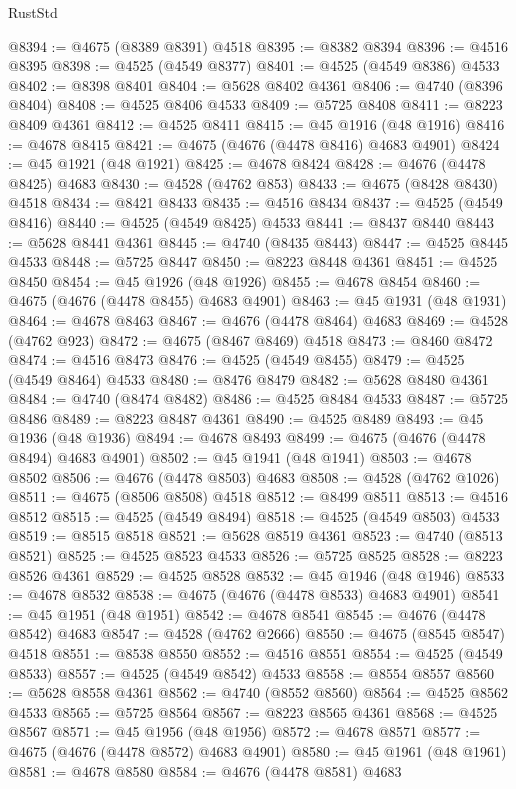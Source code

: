 \begin{lexlean}{RustStd}
\begin{coremodule}
{\begin{coremodule}
{{{{{{{{{{{{{{{{{{{{{{{{{{{{{{{{{{{{{{{{{{{{{{{{{{{{{{{{{{{{@8394 := @4675 (@8389 @8391) @4518
@8395 := @8382 @8394
@8396 := @4516 @8395
@8398 := @4525 (@4549 @8377)
@8401 := @4525 (@4549 @8386) @4533
@8402 := @8398 @8401
@8404 := @5628 @8402 @4361
@8406 := @4740 (@8396 @8404)
@8408 := @4525 @8406 @4533
@8409 := @5725 @8408
@8411 := @8223 @8409 @4361
@8412 := @4525 @8411
@8415 := @45 @1916 (@48 @1916)
@8416 := @4678 @8415
@8421 := @4675 (@4676 (@4478 @8416) @4683 @4901)
@8424 := @45 @1921 (@48 @1921)
@8425 := @4678 @8424
@8428 := @4676 (@4478 @8425) @4683
@8430 := @4528 (@4762 @853)
@8433 := @4675 (@8428 @8430) @4518
@8434 := @8421 @8433
@8435 := @4516 @8434
@8437 := @4525 (@4549 @8416)
@8440 := @4525 (@4549 @8425) @4533
@8441 := @8437 @8440
@8443 := @5628 @8441 @4361
@8445 := @4740 (@8435 @8443)
@8447 := @4525 @8445 @4533
@8448 := @5725 @8447
@8450 := @8223 @8448 @4361
@8451 := @4525 @8450
@8454 := @45 @1926 (@48 @1926)
@8455 := @4678 @8454
@8460 := @4675 (@4676 (@4478 @8455) @4683 @4901)
@8463 := @45 @1931 (@48 @1931)
@8464 := @4678 @8463
@8467 := @4676 (@4478 @8464) @4683
@8469 := @4528 (@4762 @923)
@8472 := @4675 (@8467 @8469) @4518
@8473 := @8460 @8472
@8474 := @4516 @8473
@8476 := @4525 (@4549 @8455)
@8479 := @4525 (@4549 @8464) @4533
@8480 := @8476 @8479
@8482 := @5628 @8480 @4361
@8484 := @4740 (@8474 @8482)
@8486 := @4525 @8484 @4533
@8487 := @5725 @8486
@8489 := @8223 @8487 @4361
@8490 := @4525 @8489
@8493 := @45 @1936 (@48 @1936)
@8494 := @4678 @8493
@8499 := @4675 (@4676 (@4478 @8494) @4683 @4901)
@8502 := @45 @1941 (@48 @1941)
@8503 := @4678 @8502
@8506 := @4676 (@4478 @8503) @4683
@8508 := @4528 (@4762 @1026)
@8511 := @4675 (@8506 @8508) @4518
@8512 := @8499 @8511
@8513 := @4516 @8512
@8515 := @4525 (@4549 @8494)
@8518 := @4525 (@4549 @8503) @4533
@8519 := @8515 @8518
@8521 := @5628 @8519 @4361
@8523 := @4740 (@8513 @8521)
@8525 := @4525 @8523 @4533
@8526 := @5725 @8525
@8528 := @8223 @8526 @4361
@8529 := @4525 @8528
@8532 := @45 @1946 (@48 @1946)
@8533 := @4678 @8532
@8538 := @4675 (@4676 (@4478 @8533) @4683 @4901)
@8541 := @45 @1951 (@48 @1951)
@8542 := @4678 @8541
@8545 := @4676 (@4478 @8542) @4683
@8547 := @4528 (@4762 @2666)
@8550 := @4675 (@8545 @8547) @4518
@8551 := @8538 @8550
@8552 := @4516 @8551
@8554 := @4525 (@4549 @8533)
@8557 := @4525 (@4549 @8542) @4533
@8558 := @8554 @8557
@8560 := @5628 @8558 @4361
@8562 := @4740 (@8552 @8560)
@8564 := @4525 @8562 @4533
@8565 := @5725 @8564
@8567 := @8223 @8565 @4361
@8568 := @4525 @8567
@8571 := @45 @1956 (@48 @1956)
@8572 := @4678 @8571
@8577 := @4675 (@4676 (@4478 @8572) @4683 @4901)
@8580 := @45 @1961 (@48 @1961)
@8581 := @4678 @8580
@8584 := @4676 (@4478 @8581) @4683
}}}}}}}}}}}}}}}}}}}}}}}}}}}}}}}}}}}}}}}}}}}}}}}}}}}}}}}}}}}}
\end{coremodule}}
\end{coremodule}
\end{lexlean}
